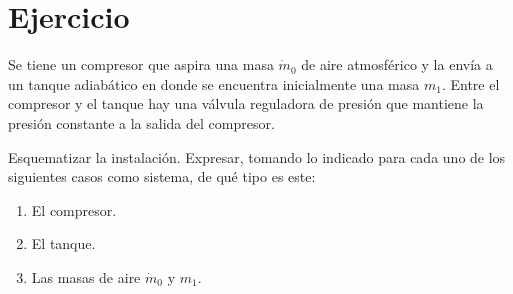 \section{Ejercicio}\label{ej:Chap02Ejercicio03}
Se tiene un compresor que aspira una masa $\dot{m}_0$ de aire atmosférico y la envía a un tanque adiabático en donde se encuentra inicialmente una masa $m_1$. Entre el compresor y el tanque hay una válvula reguladora de presión que mantiene la presión constante a la salida del
compresor. 

Esquematizar la instalación. Expresar, tomando lo indicado para cada uno de los siguientes casos como sistema, de qué tipo es este:
\begin{enumerate}
    \item El compresor.
    \item El tanque.
    \item Las masas de aire $\dot{m}_0$ y $m_1$.
\end{enumerate}